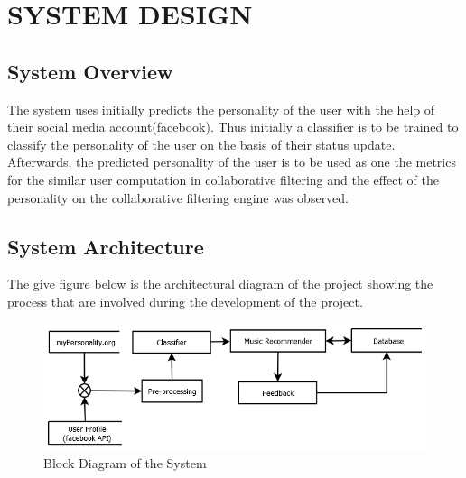 \newpage
\section{SYSTEM DESIGN}

\subsection{System Overview}
The system uses initially predicts the personality of the user with the help of their social media account(facebook). Thus initially a classifier is to be trained to classify the personality of the user on the basis of their status update. Afterwards, the predicted personality of the user is to be used as one the metrics for the similar user computation in collaborative filtering and the effect of the personality on the collaborative filtering engine was observed.

\subsection{System Architecture}
The give figure below is the architectural diagram of the project showing the process that are involved during the development of the project.

\begin{figure}[!ht]
\centering
\includegraphics[width = 16 cm]{fig/new/system.png}
\caption{Block Diagram of the System}
\label{fig:project}
\end{figure}

